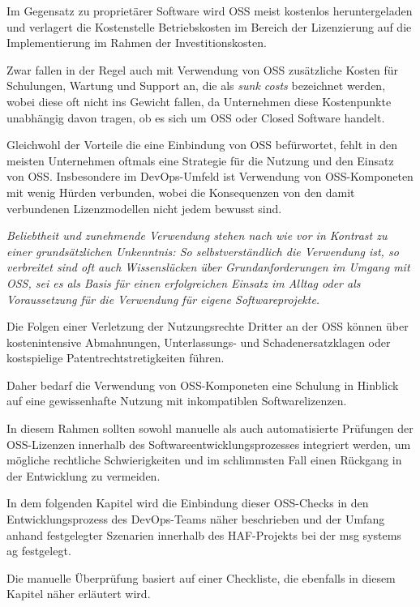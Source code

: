 Im Gegensatz zu proprietärer Software wird OSS meist kostenlos heruntergeladen und verlagert die Kostenstelle Betriebskosten im Bereich der Lizenzierung auf die Implementierung im Rahmen der Investitionskosten. \cite{augsten_10_2019} 

Zwar fallen in der Regel auch mit Verwendung von OSS zusätzliche Kosten für Schulungen, Wartung und Support an, die als \emph{sunk costs} bezeichnet werden, wobei diese oft nicht ins Gewicht fallen, da Unternehmen diese Kostenpunkte unabhängig davon tragen, ob es sich um OSS oder Closed Software handelt. \cite{augsten_10_2019} 

Gleichwohl der Vorteile die eine Einbindung von OSS befürwortet, fehlt in den meisten Unternehmen oftmals eine Strategie für die Nutzung und den Einsatz von OSS. 
Insbesondere im DevOps-Umfeld ist Verwendung von OSS-Komponeten mit wenig Hürden verbunden, wobei die Konsequenzen von den damit verbundenen Lizenzmodellen nicht jedem bewusst sind. 

\textit{Beliebtheit und zunehmende Verwendung stehen nach wie vor in Kontrast zu einer grundsätzlichen Unkenntnis: So selbstverständlich die Verwendung ist, so verbreitet sind oft auch Wissenslücken über Grundanforderungen im Umgang mit OSS, sei es als Basis für einen erfolgreichen Einsatz im Alltag oder als Voraussetzung für die Verwendung für eigene Softwareprojekte.} \cite{bitkom_ev_open_2016}

Die Folgen einer Verletzung der Nutzungsrechte Dritter an der OSS können über kostenintensive Abmahnungen, Unterlassungs- und Schadenersatzklagen oder kostspielige Patentrechtstretigkeiten führen. 

Daher bedarf die Verwendung von OSS-Komponeten eine Schulung in Hinblick auf eine gewissenhafte Nutzung mit inkompatiblen Softwarelizenzen. 

In diesem Rahmen sollten sowohl manuelle als auch automatisierte Prüfungen der OSS-Lizenzen innerhalb des Softwareentwicklungsprozesses integriert werden, um mögliche rechtliche Schwierigkeiten und im schlimmsten Fall einen Rückgang in der Entwicklung zu vermeiden. 

In dem folgenden Kapitel wird die Einbindung dieser OSS-Checks in den Entwicklungsprozess des DevOps-Teams näher beschrieben und der Umfang anhand festgelegter Szenarien innerhalb des HAF-Projekts bei der msg systems ag festgelegt. 

Die manuelle Überprüfung basiert auf einer Checkliste, die ebenfalls in diesem Kapitel näher erläutert wird. 






















